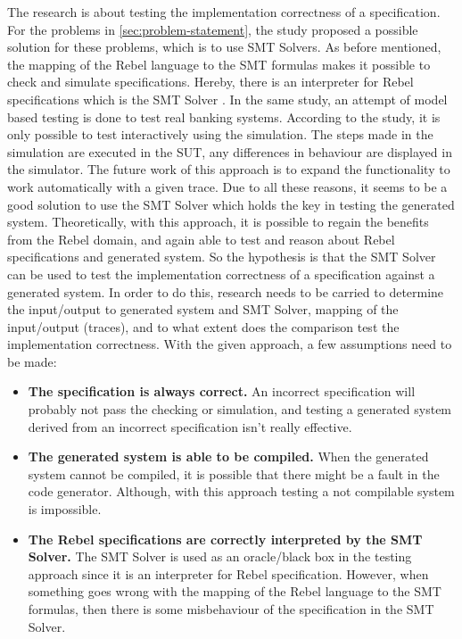 The research is about testing the implementation correctness of a specification. For the problems in \autoref{sec:problem-statement}, the study \cite[p.3]{stoelcase} proposed a possible solution for these problems, which is to use SMT Solvers. As before mentioned, the mapping of the Rebel language to the SMT formulas makes it possible to check and simulate specifications. Hereby, there is an interpreter for Rebel specifications which is the SMT Solver \cite[p.5]{stoel_storm_vinju_bosman_2016}. In the same study, an attempt of model based testing is done to test real banking systems. According to the study, it is only possible to test interactively using the simulation. The steps made in the simulation are executed in the SUT, any differences in behaviour are displayed in the simulator. The future work of this approach is to expand the functionality to work automatically with a given trace. Due to all these reasons, it seems to be a good solution to use the SMT Solver which holds the key in testing the generated system. Theoretically, with this approach, it is possible to regain the benefits from the Rebel domain, and again able to test and reason about Rebel specifications and generated system. So the hypothesis is that the SMT Solver can be used to test the implementation correctness of a specification against a generated system. In order to do this, research needs to be carried to determine the input/output to generated system and SMT Solver, mapping of the input/output (traces), and to what extent does the comparison test the implementation correctness. With the given approach, a few assumptions need to be made: 
\begin{itemize}
\item \textbf{The specification is always correct.} An incorrect specification will probably not pass the checking or simulation, and testing a generated system derived from an incorrect specification isn't really effective. 
\item \textbf{The generated system is able to be compiled.} When the generated system cannot be compiled, it is possible that there might be a fault in the code generator. Although, with this approach testing a not compilable system is impossible.
\item \textbf{The Rebel specifications are correctly interpreted by the SMT Solver.} The SMT Solver is used as an oracle/black box in the testing approach since it is an interpreter for Rebel specification. However, when something goes wrong with the mapping of the Rebel language to the SMT formulas, then there is some misbehaviour of the specification in the SMT Solver. 
\end{itemize}

